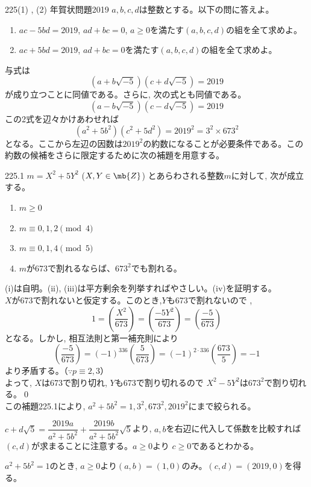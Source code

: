 \begin{prob}{225}{(1) , (2) }{年賀状問題2019}
 $a, b, c, d$は整数とする。以下の問に答えよ。
 \begin{enumerate}
  \item $ac-5bd=2019$, $ad+bc=0$, $a\ge 0$を満たす$(a, b, c, d)$の組を全て求めよ。
  \item $ac+5bd=2019$, $ad+bc=0$を満たす$(a, b, c, d)$の組を全て求めよ。
 \end{enumerate}
\end{prob}
与式は
\[(a+b\sqrt{-5})(c+d\sqrt{-5})=2019\]
が成り立つことに同値である。さらに, 次の式とも同値である。
\[(a-b\sqrt{-5})(c-d\sqrt{-5})=2019\]
この2式を辺々かけあわせれば
\[(a^2+5b^2)(c^2+5d^2)=2019^2=3^2\times 673^2\]
となる。ここから左辺の因数は$2019^2$の約数になることが必要条件である。この約数の候補をさらに限定するために次の補題を用意する。 
\begin{subthm}{225.1}
 $m=X^2+5Y^2$ ($X,Y\in \mb{Z}$) とあらわされる整数$m$に対して, 次が成立する。\\
 \begin{enumerate}[label=\roman*,align=CenterWithParen]
  \item $m\geq 0$
  \item $m\equiv 0, 1, 2 \pmod{4}$
  \item $m\equiv 0, 1, 4 \pmod{5}$
  \item $m$が673で割れるならば、$673^2$でも割れる。
 \end{enumerate}
\end{subthm}
(i)は自明。(ii), (iii)は平方剰余を列挙すればやさしい。(iv)を証明する。\\
$X$が673で割れないと仮定する。このとき,$Y$も673で割れないので
,\[1=\left(\dfrac{X^2}{673}\right)=\left(\dfrac{-5Y^2}{673}\right)=\left(\dfrac{-5}{673}\right)\]
となる。しかし, 相互法則と第一補充則により
\[ \left(\dfrac{-5}{673}\right)=(-1)^{336}\left(\dfrac{5}{673}\right)=(-1)^{2\cdot 336}\left(\dfrac{673}{5}\right)=-1 \]
より矛盾する。（$\because p\equiv 2,3$）\\
よって, $X$は673で割り切れ, $Y$も673で割り切れるので $X^2-5Y^2$は$673^2$で割り切れる。\qed\\
この補題225.1により, $a^2+5b^2=1,3^2,673^2,2019^2$にまで絞られる。

$c+d\sqrt{5}=\dfrac{2019a}{a^2+5b^2}+\dfrac{2019b}{a^2+5b^2}\sqrt{5}$より, $a,b$を右辺に代入して係数を比較すれば$(c,d)$が求まることに注意する。$a\geq 0$より $c\geq 0$であるとわかる。

$a^2+5b^2=1$のとき, $a\geq 0 $より$(a,b)=(1,0)$のみ。$(c,d)=(2019,0)$を得る。

